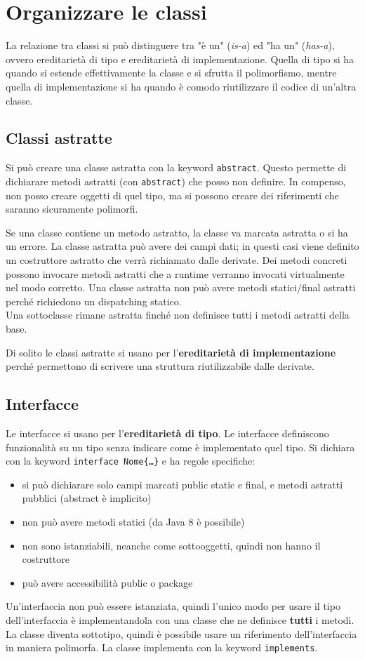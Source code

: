 \chapter{Organizzare le classi}

La relazione tra classi si può distinguere tra "è un" (\textit{is-a}) ed "ha un" (\textit{has-a}), ovvero ereditarietà di tipo e ereditarietà di implementazione. Quella di tipo si ha quando si estende effettivamente la classe e si sfrutta il polimorfismo, mentre quella di implementazione si ha quando è comodo riutilizzare il codice di un'altra classe.
\section{Classi astratte}
Si può creare una classe astratta con la keyword \texttt{abstract}. Questo permette di dichiarare metodi astratti (con \texttt{abstract}) che posso non definire. In compenso, non posso creare oggetti di quel tipo, ma si possono creare dei riferimenti che saranno sicuramente polimorfi.

Se una classe contiene un metodo astratto, la classe va marcata astratta o si ha un errore.
La classe astratta può avere dei campi dati; in questi casi viene definito un costruttore astratto che verrà richiamato dalle derivate.
Dei metodi concreti possono invocare metodi astratti che a runtime verranno invocati virtualmente nel modo corretto.
Una classe astratta non può avere metodi statici/final astratti perché richiedono un dispatching statico. \\
Una sottoclasse rimane astratta finché non definisce tutti i metodi astratti della base.

Di solito le classi astratte si usano per l'\textbf{ereditarietà di implementazione} perché permettono di scrivere una struttura riutilizzabile dalle derivate.

\section{Interfacce}
Le interfacce si usano per l'\textbf{ereditarietà di tipo}. Le interfacce definiscono funzionalità su un tipo senza indicare come è implementato quel tipo. Si dichiara con la keyword \texttt{interface Nome\{…\}} e ha regole specifiche:
\begin{itemize}
\item si può dichiarare solo campi marcati public static e final, e metodi astratti pubblici (abstract è implicito)
\item non può avere metodi statici (da Java 8 è possibile)
\item non sono istanziabili, neanche come sottooggetti, quindi non hanno il costruttore
\item può avere accessibilità public o package
\end{itemize}
Un'interfaccia non può essere istanziata, quindi l'unico modo per usare il tipo dell'interfaccia è implementandola con una classe che ne definisce \textbf{tutti} i metodi. La classe diventa sottotipo, quindi è possibile usare un riferimento dell'interfaccia in maniera polimorfa. La classe implementa con la keyword \texttt{implements}. 

